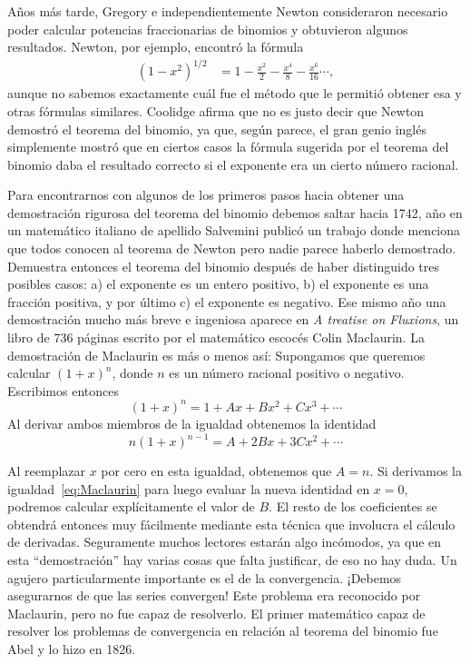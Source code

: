 Años más tarde, Gregory e independientemente Newton consideraron necesario
poder calcular potencias fraccionarias de binomios y obtuvieron algunos
resultados. Newton, por ejemplo, encontró la fórmula
\begin{align*}
	(1-x^2)^{1/2}&=1-\frac{x^2}{2}-\frac{x^4}{8}-\frac{x^6}{16}\cdots,
\end{align*}
aunque no sabemos exactamente cuál fue el método que le permitió obtener esa y
otras fórmulas similares. Coolidge afirma que no es justo decir que Newton
demostró el teorema del binomio, ya que, según parece, el gran genio inglés
simplemente mostró que en ciertos casos la fórmula sugerida por el teorema
del binomio daba el resultado correcto si el exponente era un cierto número
racional. 

Para encontrarnos con algunos de los primeros pasos hacia obtener una
demostración rigurosa del teorema del binomio debemos saltar hacia 1742, año en
un matemático italiano de apellido Salvemini publicó un trabajo donde menciona
que todos conocen al teorema de Newton pero nadie parece haberlo demostrado.
Demuestra entonces el teorema del binomio después de haber distinguido tres
posibles casos: a) el exponente es un entero positivo, b) el exponente es una
fracción positiva, y por último c) el exponente es negativo. Ese mismo año una
demostración mucho más breve e ingeniosa aparece en \emph{A treatise on
Fluxions}, un libro de 736 páginas escrito por el matemático escocés Colin
Maclaurin. La demostración de Maclaurin es más o menos así: Supongamos que
queremos calcular $(1+x)^n$, donde $n$ es un número racional positivo o
negativo. Escribimos entonces
\[
	(1+x)^n=1+Ax+Bx^2+Cx^3+\cdots
\]
Al derivar ambos miembros de la igualdad obtenemos la identidad
\begin{equation}
	\label{eq:Maclaurin}
	n(1+x)^{n-1}=A+2Bx+3Cx^2+\cdots
\end{equation}

Al reemplazar $x$ por cero en esta igualdad, obtenemos que $A=n$. Si derivamos
la igualdad~\eqref{eq:Maclaurin} para luego evaluar la nueva identidad en
$x=0$, podremos calcular explícitamente el valor de $B$. El resto de los
coeficientes se obtendrá entonces muy fácilmente mediante esta técnica que
involucra el cálculo de derivadas. Seguramente muchos lectores estarán algo incómodos, ya que 
en esta ``demostración'' hay varias cosas
que falta justificar, de eso no hay duda. Un agujero particularmente importante
es el de la convergencia. ¡Debemos asegurarnos de que las series convergen!
Este problema era reconocido por Maclaurin, pero no fue capaz de resolverlo. El
primer matemático capaz de resolver los problemas de convergencia 
en relación al teorema del binomio fue Abel y lo hizo en
1826. 



